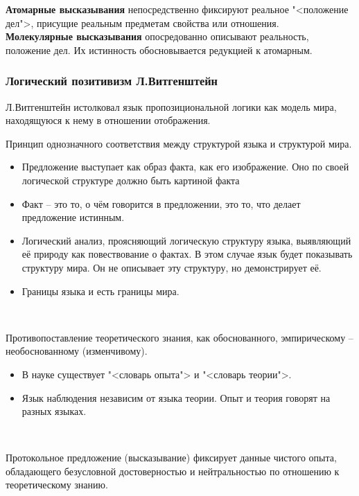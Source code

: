 \documentclass[main.tex]{subfiles}
\begin{document}
{\parindent0pt
\textbf{Атомарные высказывания} непосредственно фиксируют реальное "<положение дел">, присущие реальным предметам свойства или отношения.
}
\ \\

{\parindent0pt
\textbf{Молекулярные высказывания} опосредованно описывают реальность, положение дел.
Их истинность обосновывается редукцией к атомарным.
}
\ \\



\subsubsection{Логический позитивизм Л.Витгенштейн}

{\parindent0pt
Л.Витгенштейн истолковал язык пропозициональной логики как модель мира, находящуюся к нему в отношении отображения.
}
\ 

{\parindent0pt
Принцип однозначного соответствия между структурой языка и структурой мира.
\begin{itemize}[nosep,leftmargin=0.5cm]
\item Предложение выступает как образ факта, как его изображение.
Оно по своей логической структуре должно быть картиной факта
\item Факт -- это то, о чём говорится в предложении, это то, что делает предложение истинным.
\item Логический анализ, проясняющий логическую структуру языка, выявляющий её природу как повествование о фактах.
В этом случае язык будет показывать структуру мира.
Он не описывает эту структуру, но демонстрирует её.
\item Границы языка и есть границы мира.
\end{itemize}
}
\ 

{\parindent0pt
Противопоставление теоретического знания, как обоснованного, эмпирическому -- необоснованному (изменчивому).
\begin{itemize}[nosep,leftmargin=0.5cm]
\item В науке существует "<словарь опыта"> и "<словарь теории">.
\item Язык наблюдения независим от языка теории.
Опыт и теория говорят на разных языках.
\end{itemize}
}
\ 

{\parindent0pt
Протокольное предложение (высказывание) фиксирует данные чистого опыта, обладающего безусловной достоверностью и нейтральностью по отношению к теоретическому знанию.
}
\ \\
\end{document}
